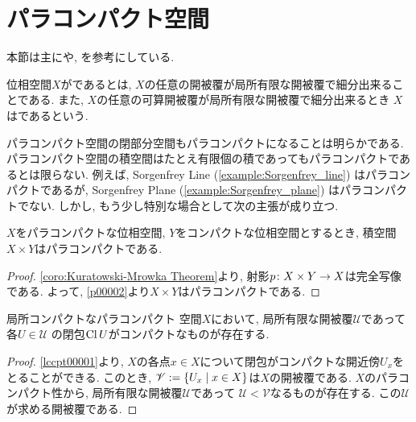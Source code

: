 \documentclass[uplatex, dvipdfmx, a4paper, 12pt, class=jsbook, crop=false]{standalone}
\begin{document}
\section{パラコンパクト空間}
\label{sec:paracompact-spaces}

\newcommand{\starset}[2]{\mathrm{St}\left(#1 , \: #2\right)}
\newcommand{\sstarset}[3]{\mathrm{St}^{#1}\left(#2 , \: #3 \right)}

\begin{source}
	本節は主に\cite[Chapter 5]{Engelking1989GT}や\cite[第8章]{Morita1981ja}, \cite[第3章]{KodamaNagami1974ja}を参考にしている.
\end{source}

\begin{definition}
	位相空間$ X $がであるとは,
	$ X $の任意の開被覆が局所有限な開被覆で細分出来ることである.
	また, $ X $の任意の可算開被覆が局所有限な開被覆で細分出来るとき
	$ X $はであるという.
\end{definition}

パラコンパクト空間の閉部分空間もパラコンパクトになることは明らかである.
パラコンパクト空間の積空間はたとえ有限個の積であってもパラコンパクトであるとは限らない.
例えば, Sorgenfrey Line (\ref{example:Sorgenfrey_line}) はパラコンパクトであるが,
Sorgenfrey Plane (\ref{example:Sorgenfrey_plane}) はパラコンパクトでない.
しかし, もう少し特別な場合として次の主張が成り立つ.

\begin{proposition}
	\label{p00004}
	$ X $をパラコンパクトな位相空間, $ Y $をコンパクトな位相空間とするとき, 積空間$ X \times Y $はパラコンパクトである.
\end{proposition}

\begin{proof}
	\cref{coro:Kuratowski-Mrowka Theorem}より, 射影$ p\colon X \times Y\to X $は完全写像である.
	よって, \cref{p00002}より$ X \times Y $はパラコンパクトである.
\end{proof}

\begin{lemma}
	\label{p00003}
	局所コンパクトなパラコンパクト  空間$ X $において,
	局所有限な開被覆$ \mathscr{U} $であって各$ U \in \mathscr{U} $
	の閉包$ \mathop{\mathrm{Cl}}\nolimits{U} $がコンパクトなものが存在する.
\end{lemma}

\begin{proof}
	\cref{lccpt00001}より, $ X $の各点$ x \in X $について閉包がコンパクトな開近傍$ U_x $をとることができる.
	このとき, $ \mathscr{V} \defeq \setcomp{U_x}{x \in X} $は$ X $の開被覆である.
	$ X $のパラコンパクト性から, 局所有限な開被覆$ \mathscr{U} $であって
	$ \mathscr{U} < \mathscr{V} $なるものが存在する.
	この$ \mathscr{U} $が求める開被覆である.
\end{proof}
\end{document}
